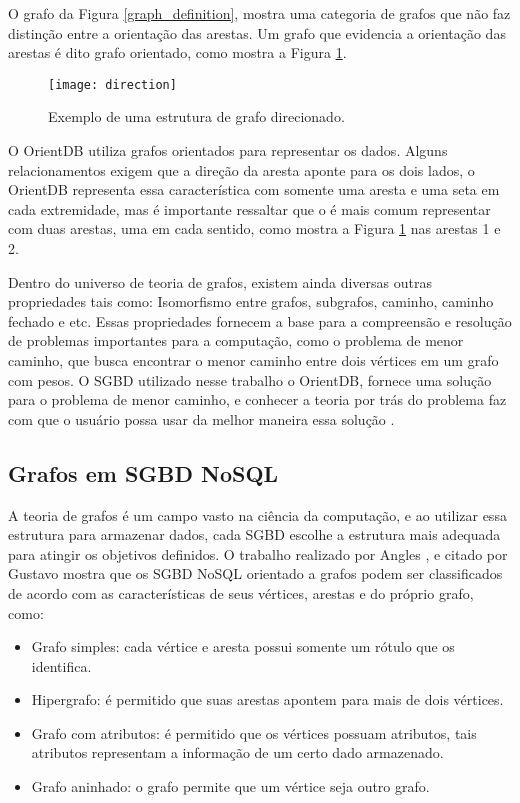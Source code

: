 	O grafo da Figura \ref{graph_definition}, mostra uma categoria de grafos que não faz distinção entre a orientação das arestas. Um grafo que evidencia a orientação das arestas é dito grafo orientado, como mostra a Figura \ref{graph_direction}.
	
\begin{figure}[H]
	\centering
    \texttt{[image: direction]}
    \caption{Exemplo de uma estrutura de grafo direcionado.}
    \label{graph_direction}
\end{figure}

	O OrientDB utiliza grafos orientados para representar os dados. Alguns relacionamentos exigem que a direção da aresta aponte para os dois lados, o OrientDB representa essa característica com somente uma aresta e uma seta em cada extremidade, mas é importante ressaltar que o é mais comum representar com duas arestas, uma em cada sentido, como mostra a Figura \ref{graph_direction} nas arestas 1 e 2.
	
	Dentro do universo de teoria de grafos, existem ainda diversas outras propriedades tais como: Isomorfismo entre grafos, subgrafos, caminho, caminho fechado e etc. Essas propriedades fornecem a base para a compreensão e resolução de problemas importantes para a computação, como o problema de menor caminho, que busca encontrar o menor caminho entre dois vértices em um grafo com pesos. O SGBD utilizado nesse trabalho o OrientDB, fornece uma solução para o problema de menor caminho, e conhecer a teoria por trás do problema faz com que o usuário possa usar da melhor maneira essa solução \cite{orientShortestPath}.
	
\subsection{Grafos em SGBD NoSQL}
	A teoria de grafos é um campo vasto na ciência da computação, e ao utilizar essa estrutura para armazenar dados, cada SGBD escolhe a estrutura mais adequada para atingir os objetivos definidos. O trabalho realizado por Angles \cite{angles2012comparison}, e citado por Gustavo \cite{mdgnosql} mostra que os SGBD NoSQL orientado a grafos podem ser classificados de acordo com as características de seus vértices, arestas e do próprio grafo, como:
\begin{itemize}
		\item Grafo simples: cada vértice e aresta possui somente um rótulo que os identifica.
		\item Hipergrafo: é permitido que suas arestas apontem para mais de dois vértices.
		\item Grafo com atributos: é permitido que os vértices possuam atributos, tais atributos representam a informação de um certo dado armazenado.
		\item Grafo aninhado: o grafo permite que um vértice seja outro grafo.
\end{itemize}

